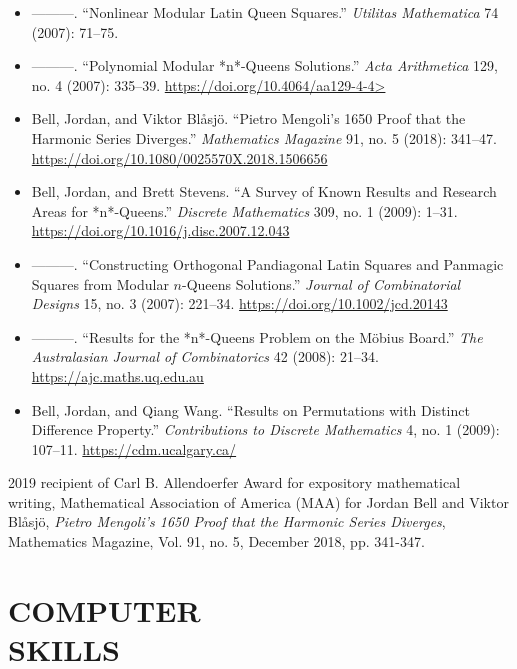 \documentclass[margin, 10pt]{res} %
\begin{document}
\begin{resume}
\begin{itemize}
\item ———. “Nonlinear Modular Latin Queen Squares.” {\em Utilitas Mathematica} 74 (2007): 71–75.

\item ———. “Polynomial Modular *n*-Queens Solutions.” {\em Acta Arithmetica} 129, no. 4 (2007): 335–39. \url{https://doi.org/10.4064/aa129-4-4>}

\item Bell, Jordan, and Viktor Blåsjö. “Pietro Mengoli’s 1650 Proof that the Harmonic Series Diverges.” {\em Mathematics Magazine} 91, no. 5 (2018): 341–47. \url{https://doi.org/10.1080/0025570X.2018.1506656}

\item Bell, Jordan, and Brett Stevens. “A Survey of Known Results and Research Areas for *n*-Queens.” {\em Discrete Mathematics} 309, no. 1 (2009): 1–31. \url{https://doi.org/10.1016/j.disc.2007.12.043}

\item ———. “Constructing Orthogonal Pandiagonal Latin Squares and Panmagic Squares from Modular $n$-Queens Solutions.” {\em Journal of Combinatorial Designs} 15, no. 3 (2007): 221–34. \url{https://doi.org/10.1002/jcd.20143}

\item ———. “Results for the *n*-Queens Problem on the Möbius Board.” {\em The Australasian Journal of Combinatorics} 42 (2008): 21–34. \url{https://ajc.maths.uq.edu.au}

\item Bell, Jordan, and Qiang Wang. “Results on Permutations with Distinct Difference Property.” {\em Contributions to Discrete Mathematics} 4, no. 1 (2009): 107–11. \url{https://cdm.ucalgary.ca/}
\end{itemize}


2019 recipient of Carl B. Allendoerfer Award for expository mathematical writing, Mathematical Association of America (MAA) for Jordan Bell and Viktor Blåsjö, {\em Pietro Mengoli’s 1650 Proof that the Harmonic Series Diverges}, Mathematics Magazine, Vol. 91, no. 5, December 2018, pp. 341-347.


\section{COMPUTER \\ SKILLS} 


\end{resume}
\end{document}

